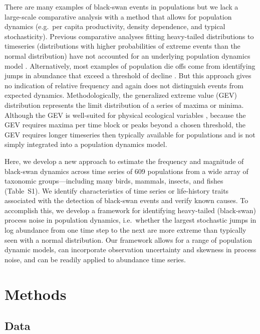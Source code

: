 There are many examples of black-swan events in populations
but we lack a large-scale comparative analysis
with a method that allows for
population dynamics
(e.g.\ per capita productivity, density dependence, and typical stochasticity).
Previous comparative analyses fitting
heavy-tailed distributions to timeseries
(distributions with higher probabilities of extreme events
than the normal distribution)
have not accounted for an underlying population dynamics model
\citep{keitt1998, allen2001, halley2002, segura2013}.
Alternatively, most examples of population die offs come from identifying
jumps in abundance that exceed a threshold of decline
\citep[e.g.][]{young1994, gerber2001, reed2003, fey2015}.
But this approach gives no indication of relative frequency
and again does not distinguish events from
expected dynamics.
Methodologically, the generalized extreme value (GEV) distribution represents
the limit distribution of a series of maxima or minima.
Although the GEV is well-suited for physical ecological variables
\citep[e.g.\ sedimentation rates or wind speeds;][]{gaines1993, denny2009},
because the GEV requires maxima per time block
or peaks beyond a chosen threshold,
the GEV requires longer timeseries then typically available
for populations and is not simply integrated
into a population dynamics model.

Here, we develop a new approach to estimate the frequency and magnitude of
black-swan dynamics across time series of 609 populations from a wide array of
taxonomic groups---including many  birds, mammals, insects, and fishes
(Table~S1). We identify characteristics of time series or
life-history traits associated with the detection of black-swan events and
verify known causes. To accomplish this, we develop a framework for identifying
heavy-tailed (black-swan) process noise in population dynamics, i.e.~whether
the largest stochastic jumps in log abundance from one time step to the next
are more extreme than typically seen with a normal distribution. Our framework
allows for a range of population dynamic models, can incorporate observation
uncertainty and skewness in process noise, and can be readily applied to
abundance time series.

\section{Methods}

\subsection{Data}

